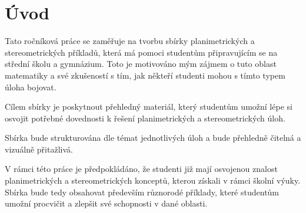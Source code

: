 \chapter*{Úvod}

Tato ročníková práce se zaměřuje na tvorbu sbírky planimetrických a stereometrických příkladů, která má pomoci studentům připravujícím se na střední školu a gymnázium. Toto je motivováno mým zájmem o tuto oblast matematiky a své zkušeností s tím, jak někteří studenti mohou s tímto typem úloha bojovat.

Cílem sbírky je poskytnout přehledný materiál, který studentům umožní lépe si osvojit potřebné dovednosti k řešení planimetrických a stereometrických úloh.

Sbírka bude strukturována dle témat jednotlivých úloh a bude přehledně čitelná a vizuálně přitažlivá.

V rámci této práce je předpokládáno, že studenti již mají osvojenou znalost planimetrických a stereometrických konceptů, kterou získali v rámci školní výuky. Sbírka bude tedy obsahovat především různorodé příklady, které studentům umožní procvičit a zlepšit své schopnosti v dané oblasti.
